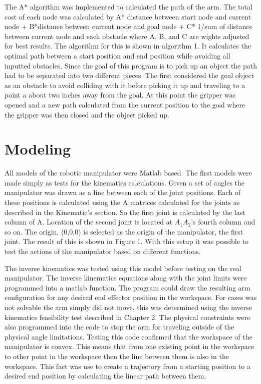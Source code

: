 \documentclass[letterpaper,12pt]{report}
\begin{document}
The A* algorithm was implemented to calculated the path of the arm. The total cost of each node was calculated by A* distance between start node and current node + B*distance between current node and goal node + C* 1/sum of distance between current node and each obstacle where A, B, and C are wights adjusted for best results. The algorithm for this is shown in algorithm 1. It calculates the optimal path between a start position and end position while avoiding all inputted obstacles. Since the goal of this program is to pick up an object the path had to be separated into two different pieces.  The first considered the goal object as an obstacle to avoid colliding with it before picking it up and traveling to a point a about two inches away from the goal. At this point the gripper was opened and a new path calculated from the current position to the goal where the gripper was then closed and the object picked up. 

\chapter{Modeling}
All models of the robotic manipulator were Matlab based. The first models were made simply as tests for the kinematics calculations. Given a set of angles the manipulator was drawn as a line between each of the joint positions. Each of these positions is calculated using the A matrices calculated for the joints as described in the Kinematic's section. So the first joint is calculated by the last column of A. Location of the second joint is located at $A_1A_2$'s fourth column and so on. The origin, (0,0,0) is selected as the origin of the manipulator, the first joint. The result of this is shown in Figure 1. With this setup it was possible to test the actions of the manipulator based on different functions.

The inverse kinematics was tested using this model before testing on the real manipulator. The inverse kinematics equations along with the joint limits were programmed into a matlab function. The program could draw the resulting arm configuration for any desired end effector position in the workspace. For cases was not solvable the arm simply did not move, this was determined using the inverse kinematics feasibility test described in Chapter 2. The physical constraints were also programmed into the code to stop the arm for traveling outside of the physical angle limitations. Testing this code confirmed that the workspace of the manipulator is convex. This means that from one existing point in the workspace to other point in the workspace then the line between them is also in the workspace. This fact was use to create a trajectory from a starting position to a desired end position by calculating the linear path between them.
\end{document}
